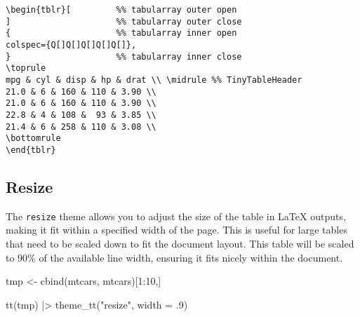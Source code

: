 \documentclass[
  letterpaper,
  DIV=11,
  numbers=noendperiod]{scrartcl}
\newenvironment{Shaded}{\begin{snugshade}}{\end{snugshade}}
\newcommand{\AttributeTok}[1]{\textcolor[rgb]{0.40,0.45,0.13}{#1}}
\newcommand{\DecValTok}[1]{\textcolor[rgb]{0.68,0.00,0.00}{#1}}
\newcommand{\FunctionTok}[1]{\textcolor[rgb]{0.28,0.35,0.67}{#1}}
\newcommand{\NormalTok}[1]{\textcolor[rgb]{0.00,0.23,0.31}{#1}}
\newcommand{\OtherTok}[1]{\textcolor[rgb]{0.00,0.23,0.31}{#1}}
\newcommand{\SpecialCharTok}[1]{\textcolor[rgb]{0.37,0.37,0.37}{#1}}
\newcommand{\StringTok}[1]{\textcolor[rgb]{0.13,0.47,0.30}{#1}}
\begin{document}
\begin{verbatim}
\begin{tblr}[         %% tabularray outer open
]                     %% tabularray outer close
{                     %% tabularray inner open
colspec={Q[]Q[]Q[]Q[]Q[]},
}                     %% tabularray inner close
\toprule
mpg & cyl & disp & hp & drat \\ \midrule %% TinyTableHeader
21.0 & 6 & 160 & 110 & 3.90 \\
21.0 & 6 & 160 & 110 & 3.90 \\
22.8 & 4 & 108 &  93 & 3.85 \\
21.4 & 6 & 258 & 110 & 3.08 \\
\bottomrule
\end{tblr} 
\end{verbatim}

\subsection{Resize}\label{resize}

The \texttt{resize} theme allows you to adjust the size of the table in
LaTeX outputs, making it fit within a specified width of the page. This
is useful for large tables that need to be scaled down to fit the
document layout. This table will be scaled to 90\% of the available line
width, ensuring it fits nicely within the document.

\begin{Shaded}
\begin{Highlighting}[]
\NormalTok{tmp }\OtherTok{\textless{}{-}} \FunctionTok{cbind}\NormalTok{(mtcars, mtcars)[}\DecValTok{1}\SpecialCharTok{:}\DecValTok{10}\NormalTok{,]}

\FunctionTok{tt}\NormalTok{(tmp) }\SpecialCharTok{|\textgreater{}} \FunctionTok{theme\_tt}\NormalTok{(}\StringTok{"resize"}\NormalTok{, }\AttributeTok{width =}\NormalTok{ .}\DecValTok{9}\NormalTok{)}
\end{Highlighting}
\end{Shaded}
\end{document}
